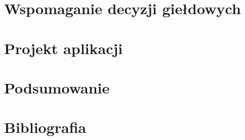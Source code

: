 \documentclass[a4paper, twoside, 11pt, openright]{article}
\begin{document}
    
\section{Wspomaganie decyzji giełdowych}

\section{Projekt aplikacji}

\section{Podsumowanie}


\newpage

\section{Bibliografia}
\end{document}
